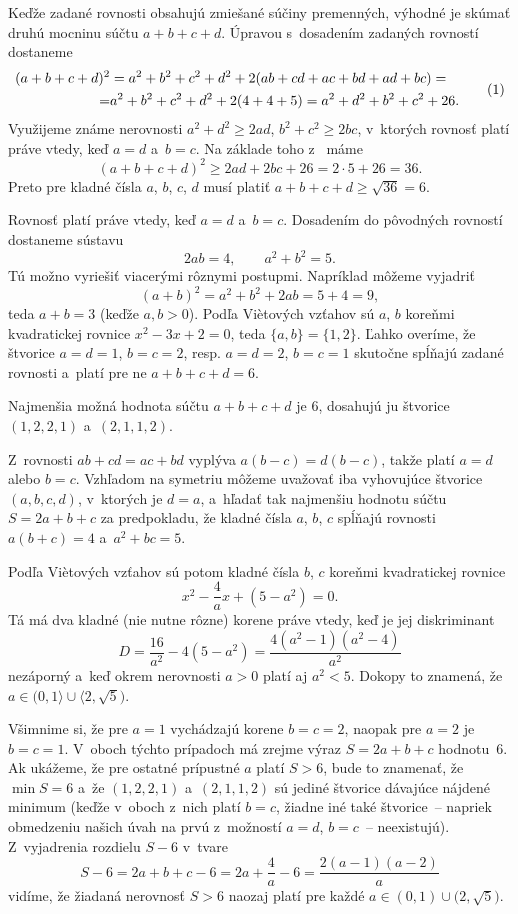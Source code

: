 {%
Keďže zadané rovnosti obsahujú zmiešané súčiny premenných, výhodné je skúmať druhú mocninu súčtu $a+b+c+d$. Úpravou s~dosadením zadaných rovností dostaneme
$$
\aligned
(a+b+c+d)^2&=a^2+b^2+c^2+d^2+2(ab+cd+ac+bd+ad+bc)=\\
=&a^2+b^2+c^2+d^2+2(4+4+5)=a^2+d^2+b^2+c^2+26.
\endaligned
\tag1
$$
Využijeme známe nerovnosti $a^2+d^2\ge2ad$, $b^2+c^2\ge2bc$, v~ktorých rovnosť platí práve vtedy, keď $a=d$ a~$b=c$. Na základe toho z~ máme
$$
(a+b+c+d)^2\ge 2ad+2bc+26=2\cdot5+26=36.
$$
Preto pre kladné čísla $a$, $b$, $c$, $d$ musí platiť $a+b+c+d\ge\sqrt{36}=6$.

Rovnosť platí práve vtedy, keď $a=d$ a~$b=c$. Dosadením do pôvodných rovností dostaneme sústavu
$$
2ab=4,\qquad a^2+b^2=5.
$$
Tú možno vyriešiť viacerými rôznymi postupmi. Napríklad môžeme vyjadriť
$$
(a+b)^2=a^2+b^2+2ab=5+4=9,
$$
teda $a+b=3$ (keďže $a,b>0$). Podľa Vi\`etových vzťahov sú $a$, $b$ koreňmi kvadratickej rovnice $x^2-3x+2=0$, teda $\{a,b\}=\{1,2\}$. Ľahko overíme, že štvorice $a=d=1$, $b=c=2$, resp. $a=d=2$, $b=c=1$ skutočne spĺňajú zadané rovnosti a~platí pre ne $a+b+c+d=6$.

\odpoved
Najmenšia možná hodnota súčtu $a+b+c+d$ je $6$, dosahujú ju štvorice $(1,2,2,1)$ a~$(2,1,1,2)$.

\ineriesenie
Z~rovnosti $ab+cd=ac+bd$ vyplýva $a(b-c)=d(b-c)$, takže platí $a=d$ alebo $b=c$. Vzhľadom na symetriu môžeme uvažovať iba vyhovujúce štvorice $(a,b,c,d)$, v~ktorých je $d=a$, a~hľadať tak najmenšiu hodnotu súčtu $S=2a+b+c$ za predpokladu, že kladné čísla $a$, $b$, $c$ spĺňajú rovnosti
$a(b+c)=4$ a~$a^2+bc=5$.

Podľa Vi\`etových vzťahov sú potom kladné čísla $b$, $c$ koreňmi kvadratickej rovnice
$$
x^2-\frac{4}{a}x+(5-a^2)=0.
$$
Tá má dva kladné (nie nutne rôzne) korene práve vtedy, keď je jej diskriminant
$$
D=\frac{16}{a^2}-4(5-a^2)=\frac{4(a^2-1)(a^2-4)}{a^2}
$$
nezáporný a~keď okrem nerovnosti $a>0$ platí aj $a^2<5$. Dokopy to znamená, že $a\in(0,1\rangle\cup\bigl\langle2,\sqrt5\bigr)$.

Všimnime si, že pre $a=1$ vychádzajú korene $b=c=2$, naopak pre $a=2$ je $b=c=1$. V~oboch týchto prípadoch má zrejme výraz $S=2a+b+c$ hodnotu~$6$. Ak ukážeme, že pre ostatné prípustné $a$ platí $S>6$, bude to znamenať, že $\min S=6$ a~že $(1,2,2,1)$ a~$(2,1,1,2)$ sú jediné štvorice dávajúce nájdené minimum (keďže v~oboch z~nich platí $b=c$, žiadne iné také štvorice~-- napriek obmedzeniu našich úvah na prvú z~možností $a=d$, $b=c$~-- neexistujú). Z~vyjadrenia rozdielu $S-6$ v~tvare
$$
S-6=2a+b+c-6=2a+\frac{4}{a}-6=\frac{2(a-1)(a-2)}{a}
$$
vidíme, že žiadaná nerovnosť $S>6$ naozaj platí pre každé $a\in(0,1)\cup\bigl(2,\sqrt5\bigr)$.

}
